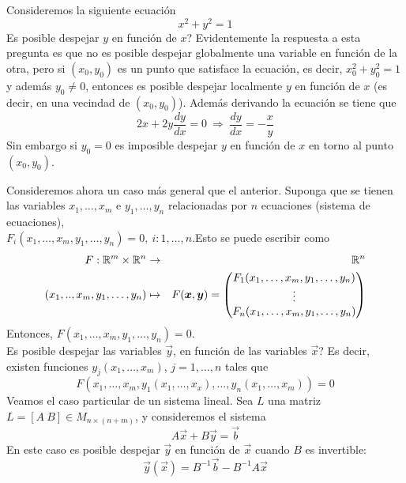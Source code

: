 \begin{ejemplo}
Consideremos la siguiente ecuaci\'on
\[x^2+y^2=1\]
{\textquestiondown}Es posible despejar $y$ en funci\'on de $x$? Evidentemente la
respuesta a esta pregunta es que no es posible despejar
globalmente una variable en funci\'on de la otra, pero si
$(x_0,y_0)$ es un punto que satisface la ecuaci\'on, es decir,
$x_0^2+y_0^2=1$ y adem\'as $y_0\neq 0$, entonces es posible
despejar localmente $y$ en funci\'on de $x$ (es decir, en una
vecindad de $(x_0,y_0)$). Adem\'as derivando la ecuaci\'on se
tiene que
\[2x+2y\frac{dy}{dx}=0\:\Rightarrow\:\frac{dy}{dx}=-\frac{x}{y}\]
Sin embargo si $y_0=0$ es imposible despejar $y$ en funci\'on de
$x$ en torno al punto $(x_0,y_0)$.
\end{ejemplo}

\begin{ejemplo}
Consideremos ahora un caso m\'as general que
el anterior. Suponga que se tienen las variables $x_1,\ldots,x_m$ e
$y_1,\ldots,y_n$ relacionadas por $n$ ecuaciones (sistema de
ecuaciones),\\
$F_i(x_1,\ldots, x_m,y_1,\ldots,y_n)=0,\: i:1,\ldots,n$.Esto
se puede escribir como
\begin{eqnarray*}
F:\mathbb{R}^m\times\mathbb{R}^n &\to& \mathbb{R}^n \\ 
(x_1,..,x_m,y_1,\ldots,y_n) &\mapsto& F(\boldsymbol{x},\boldsymbol{y})=
\begin{pmatrix}
F_1(x_1,\ldots,x_m,y_1,\ldots,y_n) \cr \vdots \cr 
F_n(x_1,\ldots,x_m,y_1,\ldots,y_n)
\end{pmatrix}
\end{eqnarray*}
Entonces, $F(x_1,\ldots,x_m,y_1,\ldots,y_n)=0$.
\\{\textquestiondown}Es posible despejar las
variables $\vec{y}$, en funci\'on de las variables $\vec{x}$? Es decir,
existen funciones $y_j(x_1,\ldots,x_m)$, $j=1,\ldots,n$ tales que
$$F(x_1,\ldots,x_m,y_1(x_1,\ldots,x_x),\ldots,y_n(x_1,\ldots,x_m))=0$$ 
Veamos
el caso particular de un sistema lineal. Sea $L$ una matriz
$L=[A\: B]\in M_{n\times(n+m)}$, y consideremos el sistema
\[A\vec{x}+B\vec{y}=\vec{b}\] En este caso es posible despejar $\vec{y}$ en funci\'on de
$\vec{x}$ cuando $B$ es invertible: \[\vec{y}(\vec{x})=B^{-1}\vec{b}-B^{-1}A\vec{x}\] 
\end{ejemplo}

